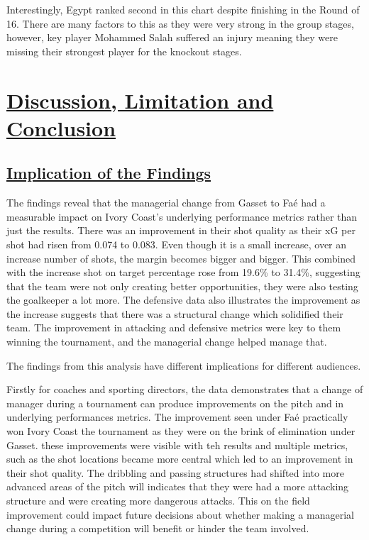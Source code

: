 \documentclass[
  11pt,
  letterpaper,
  DIV=11,
  numbers=noendperiod]{scrartcl}
\begin{document}
Interestingly, Egypt ranked second in this chart despite finishing in
the Round of 16. There are many factors to this as they were very strong
in the group stages, however, key player Mohammed Salah suffered an
injury meaning they were missing their strongest player for the knockout
stages.

\section{\texorpdfstring{\ul{Discussion, Limitation and
Conclusion}}{Discussion, Limitation and Conclusion}}\label{discussion-limitation-and-conclusion}

\subsection{\texorpdfstring{\ul{Implication of the
Findings}}{Implication of the Findings}}\label{implication-of-the-findings}

The findings reveal that the managerial change from Gasset to Faé had a
measurable impact on Ivory Coast's underlying performance metrics rather
than just the results. There was an improvement in their shot quality as
their xG per shot had risen from 0.074 to 0.083. Even though it is a
small increase, over an increase number of shots, the margin becomes
bigger and bigger. This combined with the increase shot on target
percentage rose from 19.6\% to 31.4\%, suggesting that the team were not
only creating better opportunities, they were also testing the
goalkeeper a lot more. The defensive data also illustrates the
improvement as the increase suggests that there was a structural change
which solidified their team. The improvement in attacking and defensive
metrics were key to them winning the tournament, and the managerial
change helped manage that.

The findings from this analysis have different implications for
different audiences.

Firstly for coaches and sporting directors, the data demonstrates that a
change of manager during a tournament can produce improvements on the
pitch and in underlying performances metrics. The improvement seen under
Faé practically won Ivory Coast the tournament as they were on the brink
of elimination under Gasset. these improvements were visible with teh
results and multiple metrics, such as the shot locations became more
central which led to an improvement in their shot quality. The dribbling
and passing structures had shifted into more advanced areas of the pitch
will indicates that they were had a more attacking structure and were
creating more dangerous attacks. This on the field improvement could
impact future decisions about whether making a managerial change during
a competition will benefit or hinder the team involved.
\end{document}
